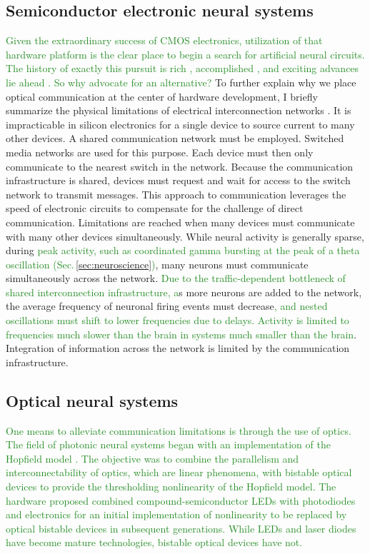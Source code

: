 \documentclass[twocolumn]{article}
\begin{document}
\subsection{Semiconductor electronic neural systems}
\textcolor{ForestGreen}{Given the extraordinary success of CMOS electronics, utilization of that hardware platform is the clear place to begin a search for artificial neural circuits. The history of exactly this pursuit is rich \cite{me1989,me1990,lide2015}, accomplished \cite{voma2007,inli2011,chst2014,aast2018,boro2018}, and exciting advances lie ahead \cite{stin2019}. So why advocate for an alternative?} To further explain why we place optical communication at the center of hardware development, I briefly summarize the physical limitations of electrical interconnection networks \cite{hepa2012}. It is impracticable in silicon electronics for a single device to source current to many other devices. A shared communication network must be employed. Switched media networks are used for this purpose. Each device must then only communicate to the nearest switch in the network. Because the communication infrastructure is shared, devices must request and wait for access to the switch network to transmit messages. This approach to communication leverages the speed of electronic circuits to compensate for the challenge of direct communication. Limitations are reached when many devices must communicate with many other devices simultaneously. While neural activity is generally sparse, during \textcolor{ForestGreen}{peak activity, such as coordinated gamma bursting at the peak of a theta oscillation (Sec.\,\ref{sec:neuroscience})}, many neurons must communicate simultaneously across the network. \textcolor{ForestGreen}{Due to the traffic-dependent bottleneck of shared interconnection infrastructure, a}s more neurons are added to the network, the average frequency of neuronal firing events must decrease\textcolor{ForestGreen}{, and nested oscillations must shift to lower frequencies due to delays. Activity is limited to frequencies much slower than the brain in systems much smaller than the brain}. Integration of information across the network is limited by the communication infrastructure.

\subsection{Optical neural systems}
\textcolor{ForestGreen}{One means to alleviate communication limitations is through the use of optics. The field of photonic neural systems began \cite{psfa1985,faps1985} with an implementation of the Hopfield model \cite{ho1982}. The objective was to combine the parallelism and interconnectability of optics, which are linear phenomena, with bistable optical devices to provide the thresholding nonlinearity of the Hopfield model. The hardware proposed combined compound-semiconductor LEDs with photodiodes and electronics for an initial implementation of nonlinearity to be replaced by optical bistable devices in subsequent generations. While LEDs and laser diodes have become mature technologies, bistable optical devices have not.}
\end{document}
